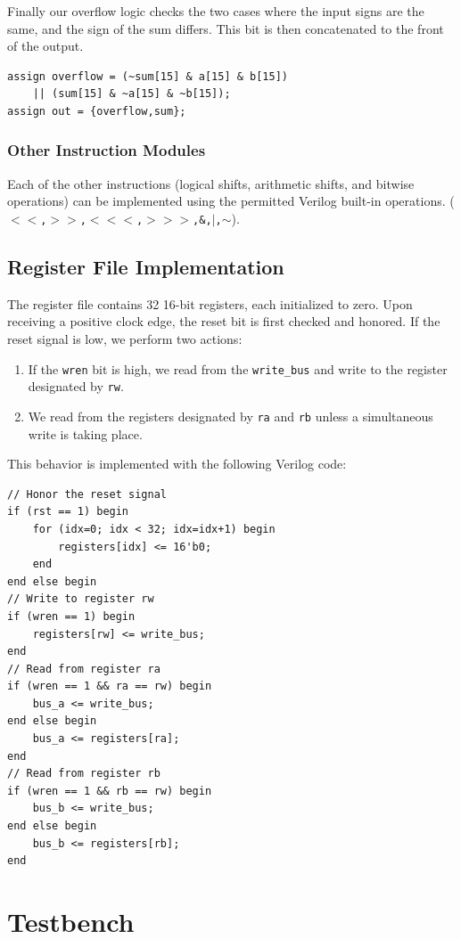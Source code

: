 \documentclass[11pt]{article}
\begin{document}
Finally our overflow logic checks the two cases where the input signs are the same, and the sign of the sum differs. This bit is then concatenated to the front of the output.

\begin{lstlisting}
assign overflow = (~sum[15] & a[15] & b[15]) 
	|| (sum[15] & ~a[15] & ~b[15]);
assign out = {overflow,sum};
\end{lstlisting}

\subsubsection{Other Instruction Modules}
Each of the other instructions (logical shifts, arithmetic shifts, and bitwise operations) can be implemented using the permitted Verilog built-in operations. (\texttt{$<<$,$>>$,$<<<$,$>>>$,\&,$|$,$\sim$}).
\subsection{Register File Implementation}
The register file contains 32 16-bit registers, each initialized to zero. Upon receiving a positive clock edge, the reset bit is first checked and honored. If the reset signal is low, we perform two actions:
\begin{enumerate}
	\item If the \texttt{wren} bit is high, we read from the \texttt{write\_bus} and write to the register designated by \texttt{rw}.
	
	\item We read from the registers designated by \texttt{ra} and \texttt{rb} unless a simultaneous write is taking place.
\end{enumerate}

This behavior is implemented with the following Verilog code:
\begin{lstlisting}
// Honor the reset signal
if (rst == 1) begin
	for (idx=0; idx < 32; idx=idx+1) begin
		registers[idx] <= 16'b0;
	end
end else begin
// Write to register rw
if (wren == 1) begin
	registers[rw] <= write_bus;
end 
// Read from register ra
if (wren == 1 && ra == rw) begin
	bus_a <= write_bus;
end else begin
	bus_a <= registers[ra];
end
// Read from register rb
if (wren == 1 && rb == rw) begin
	bus_b <= write_bus;
end else begin
	bus_b <= registers[rb];
end
\end{lstlisting}

\section{Testbench}
\end{document}
